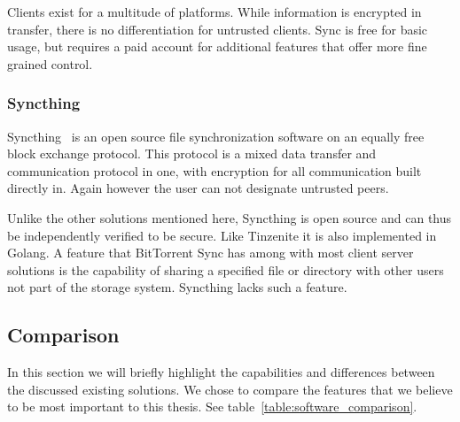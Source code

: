 Clients exist for a multitude of platforms.
While information is encrypted in transfer, there is no differentiation for untrusted clients.
Sync is free for basic usage, but requires a paid account for additional features that offer more fine grained control.

\subsubsection{Syncthing}
\label{subs:Syncthing}

Syncthing~\cite{web:site:synthing} is an open source file synchronization software on an equally free block exchange protocol.
This protocol is a mixed data transfer and communication protocol in one, with encryption for all communication built directly in.
Again however the user can not designate untrusted peers.

Unlike the other solutions mentioned here, Syncthing is open source and can thus be independently verified to be secure.
Like Tinzenite it is also implemented in Golang.
A feature that BitTorrent Sync has among with most client server solutions is the capability of sharing a specified file or directory with other users not part of the storage system.
Syncthing lacks such a feature.

\subsection{Comparison}
\label{sub:Comparison}

In this section we will briefly highlight the capabilities and differences between the discussed existing solutions.
We chose to compare the features that we believe to be most important to this thesis.
See table~\ref{table:software_comparison}.

